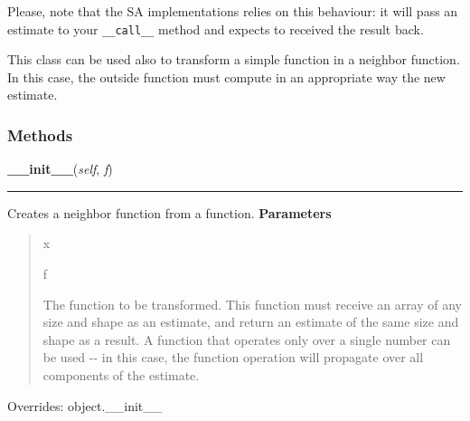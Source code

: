 Please, note that the SA implementations relies on this behaviour: it will
pass an estimate to your \texttt{\_\_call\_\_} method and expects to received the
result back.

This class can be used also to transform a simple function in a neighbor
function. In this case, the outside function must compute in an appropriate
way the new estimate.


  \subsubsection{Methods}

    \vspace{0.5ex}

\hspace{.8\funcindent}\begin{boxedminipage}{\funcwidth}

    \raggedright \textbf{\_\_init\_\_}(\textit{self}, \textit{f})

    \vspace{-1.5ex}

    \rule{\textwidth}{0.5\fboxrule}
\setlength{\parskip}{2ex}

Creates a neighbor function from a function.
\setlength{\parskip}{1ex}
      \textbf{Parameters}
      \vspace{-1ex}

      \begin{quote}
        \begin{Ventry}{x}

          \item[f]


The function to be transformed. This function must receive an array
of any size and shape as an estimate, and return an estimate of the
same size and shape as a result. A function that operates only over
a single number can be used -{}- in this case, the function operation
will propagate over all components of the estimate.
        \end{Ventry}

      \end{quote}

      Overrides: object.\_\_init\_\_

    \end{boxedminipage}

